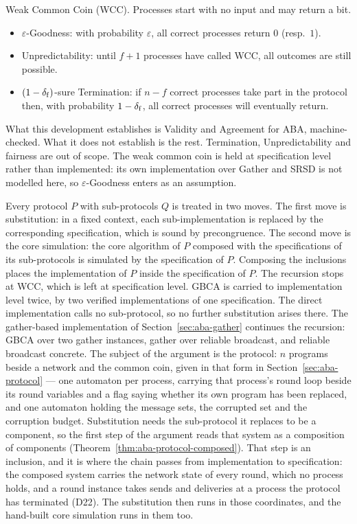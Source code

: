 Weak Common Coin (WCC).
Processes start with no input and may return a bit.
\begin{itemize}
  \item $\varepsilon$-Goodness: with probability $\varepsilon$, all correct
    processes return $0$ (resp.\ $1$).
  \item Unpredictability: until $f+1$ processes have called WCC, all outcomes
    are still possible.
  \item $(1-\delta_{\mathrm{f}})$-sure Termination: if $n-f$ correct processes take part in
    the protocol then, with probability $1-\delta_{\mathrm{f}}$, all correct processes will eventually return.
\end{itemize}

What this development establishes is Validity and Agreement for ABA, machine-checked.
What it does not establish is the rest.
Termination, Unpredictability and fairness are out of scope.
The weak common coin is held at specification level rather than implemented: its own implementation over Gather and SRSD is not modelled here, so $\varepsilon$-Goodness enters as an assumption.

Every protocol $P$ with sub-protocols $Q$ is treated in two moves.
The first move is substitution: in a fixed context, each sub-implementation is replaced by the corresponding specification, which is sound by precongruence.
The second move is the core simulation: the core algorithm of $P$ composed with the specifications of its sub-protocols is simulated by the specification of $P$. Composing the inclusions places the implementation of $P$ inside the specification of $P$. The recursion stops at WCC, which is left at specification level.
GBCA is carried to implementation level twice, by two verified implementations of one specification.
The direct implementation calls no sub-protocol, so no further substitution arises there.
The gather-based implementation of Section~\ref{sec:aba-gather} continues the recursion: GBCA over two gather instances, gather over reliable broadcast, and reliable broadcast concrete.
The subject of the argument is the protocol: $n$ programs beside a network and the common coin, given in that form in Section~\ref{sec:aba-protocol} --- one automaton per process, carrying that process's round loop beside its round variables and a flag saying whether its own program has been replaced, and one automaton holding the message sets, the corrupted set and the corruption budget.
Substitution needs the sub-protocol it replaces to be a component, so the first step of the argument reads that system as a composition of components (Theorem~\ref{thm:aba-protocol-composed}).
That step is an inclusion, and it is where the chain passes from implementation to specification: the composed system carries the network state of every round, which no process holds, and a round instance takes sends and deliveries at a process the protocol has terminated (D22).
The substitution then runs in those coordinates, and the hand-built core simulation runs in them too.

